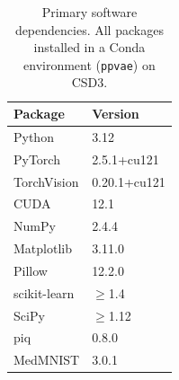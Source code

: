\documentclass[12pt, a4paper, twoside, openright]{book}
\begin{document}
\begin{appendices}
\begin{table}[htbp]
\centering
\caption[Software environment]{Primary software dependencies. All packages installed in a Conda environment (\texttt{ppvae}) on CSD3.}
\label{tab:app:software}
\begin{tabular}{ll}
\toprule
\textbf{Package} & \textbf{Version} \\
\midrule
Python       & 3.12 \\
PyTorch      & 2.5.1+cu121 \\
TorchVision  & 0.20.1+cu121 \\
CUDA         & 12.1 \\
NumPy        & 2.4.4 \\
Matplotlib   & 3.11.0 \\
Pillow       & 12.2.0 \\
scikit-learn & $\geq$1.4 \\
SciPy        & $\geq$1.12 \\
piq          & 0.8.0 \\
MedMNIST     & 3.0.1 \\
\bottomrule
\end{tabular}
\end{table}


\end{appendices}
\end{document}

